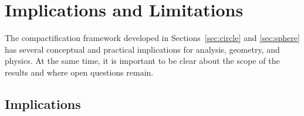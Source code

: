 \documentclass[12pt]{article}
\theoremstyle{remark}
\begin{document}
\section{Implications and Limitations}
\label{sec:discussion}

The compactification framework developed in Sections~\ref{sec:circle} and 
\ref{sec:sphere} has several conceptual and practical implications for analysis, 
geometry, and physics. At the same time, it is important to be clear about the 
scope of the results and where open questions remain.

\subsection{Implications}
\end{document}
